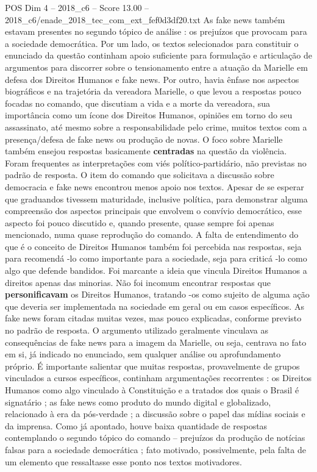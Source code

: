 \begin{textsample}{POS Dim 4 – 2018\_c6 – Score 13.00 – 2018\_c6/enade\_2018\_tec\_com\_ext\_fef0d3df20.txt}
As fake news também estavam presentes no segundo tópico de análise : os prejuízos que provocam para a sociedade democrática.
Por um lado, os textos selecionados para constituir o enunciado da questão continham apoio suficiente para formulação e articulação de argumentos para discorrer sobre o tensionamento entre a atuação da Marielle em defesa dos Direitos Humanos e fake news.
Por outro, havia ênfase nos aspectos biográficos e na trajetória da vereadora Marielle, o que levou a respostas pouco focadas no comando, que discutiam a vida e a morte da vereadora, sua importância como um ícone dos Direitos Humanos, opiniões em torno do seu assassinato, até mesmo sobre a responsabilidade pelo crime, muitos textos com a presença/defesa de fake news ou produção de novas.
O foco sobre Marielle também ensejou respostas basicamente \textbf{centradas} na questão da violência.
Foram frequentes as interpretações com viés político-partidário, não previstas no padrão de resposta.
O item do comando que solicitava a discussão sobre democracia e fake news encontrou menos apoio nos textos.
Apesar de se esperar que graduandos tivessem maturidade, inclusive política, para demonstrar alguma compreensão dos aspectos principais que envolvem o convívio democrático, esse aspecto foi pouco discutido e, quando presente, quase sempre foi apenas mencionado, numa quase reprodução do comando.
A falta de entendimento do que é o conceito de Direitos Humanos também foi percebida nas respostas, seja para recomendá -lo como importante para a sociedade, seja para criticá -lo como algo que defende bandidos.
Foi marcante a ideia que vincula Direitos Humanos a direitos apenas das minorias.
Não foi incomum encontrar respostas que \textbf{personificavam} os Direitos Humanos, tratando -os como sujeito de alguma ação que deveria ser implementada na sociedade em geral ou em casos específicos.
As fake news foram citadas muitas vezes, mas pouco explicadas, conforme previsto no padrão de resposta.
O argumento utilizado geralmente vinculava as consequências de fake news para a imagem da Marielle, ou seja, centrava no fato em si, já indicado no enunciado, sem qualquer análise ou aprofundamento próprio.
É importante salientar que muitas respostas, provavelmente de grupos vinculados a cursos específicos, continham argumentações recorrentes : os Direitos Humanos como algo vinculado à Constituição e a tratados dos quais o Brasil é signatário ; as fake news como produto do mundo digital e globalizado, relacionado à era da pós-verdade ; a discussão sobre o papel das mídias sociais e da imprensa.
Como já apontado, houve baixa quantidade de respostas contemplando o segundo tópico do comando – prejuízos da produção de notícias falsas para a sociedade democrática ; fato motivado, possivelmente, pela falta de um elemento que ressaltasse esse ponto nos textos motivadores.

\end{textsample}
